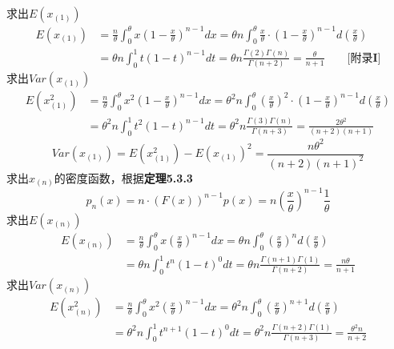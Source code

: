 \documentclass[a4paper]{ctexart}    %
\begin{document}
	求出$ E(x_{(1)}) $
	\begin{equation*}
		\begin{split}
			E(x_{(1)}) &= \frac{n}{\theta} \int_{0}^{\theta} x \left(1 - \frac{x}{\theta}\right)^{n-1} dx = \theta n \int_{0}^{\theta} \frac{x}{\theta} \cdot \left(1 - \frac{x}{\theta}\right)^{n-1} d \left(\frac{x}{\theta}\right) \\
			&= \theta n \int_{0}^{1} t(1-t)^{n-1}dt = \theta n \frac{\Gamma(2)\Gamma(n)}{\Gamma(n+2)} = \frac{\theta}{n+1} \qquad \textbf{[附录I]}
		\end{split}
	\end{equation*}
	求出$ Var(x_{(1)}) $
	\begin{equation*}
		\begin{split}
			E(x_{(1)}^2) &= \frac{n}{\theta} \int_{0}^{\theta} x^2 \left(1 - \frac{x}{\theta}\right)^{n-1} dx = \theta^2 n \int_{0}^{\theta} \left(\frac{x}{\theta}\right)^2 \cdot \left(1 - \frac{x}{\theta}\right)^{n-1} d \left(\frac{x}{\theta}\right) \\
			&= \theta^2 n \int_{0}^{1} t^2 (1-t)^{n-1}dt = \theta^2 n \frac{\Gamma(3)\Gamma(n)}{\Gamma(n+3)} = \frac{2\theta^2}{(n+2)(n+1)}
		\end{split}
	\end{equation*}
	\begin{equation*}
		Var(x_{(1)}) = E(x_{(1)}^2) - E(x_{(1)})^2 = \frac{n\theta^2}{(n+2)(n+1)^2}
	\end{equation*}
	求出$ x_{(n)} $的密度函数，根据\textbf{定理5.3.3}
	\begin{equation*}
		p_n(x) = n \cdot (F(x))^{n-1} p(x) = n \left(\frac{x}{\theta}\right)^{n-1} \frac{1}{\theta}
	\end{equation*}
	求出$ E(x_{(n)}) $
	\begin{equation*}
		\begin{split}
			E(x_{(n)}) &= \frac{n}{\theta} \int_{0}^{\theta} x\left(\frac{x}{\theta}\right)^{n-1}dx = \theta n \int_{0}^{\theta} \left(\frac{x}{\theta}\right)^{n} d\left(\frac{x}{\theta}\right) \\
			&= \theta n \int_{0}^{1} t^n (1-t)^0 dt = \theta n \frac{\Gamma(n+1)\Gamma(1)}{\Gamma(n+2)} = \frac{n \theta}{n + 1}
		\end{split}
	\end{equation*}
	求出$ Var(x_{(n)}) $
	\begin{equation*}
		\begin{split}
			E(x_{(n)}^2) &= \frac{n}{\theta} \int_{0}^{\theta} x^2 \left(\frac{x}{\theta}\right)^{n-1}dx = \theta^2 n \int_{0}^{\theta} \left(\frac{x}{\theta}\right)^{n+1} d\left(\frac{x}{\theta}\right) \\
			&= \theta^2 n \int_{0}^{1} t^{n+1}(1-t)^0 dt = \theta^2 n \frac{\Gamma(n+2)\Gamma(1)}{\Gamma(n+3)} = \frac{\theta^2 n}{n+2}
		\end{split}
	\end{equation*}
\end{document}
